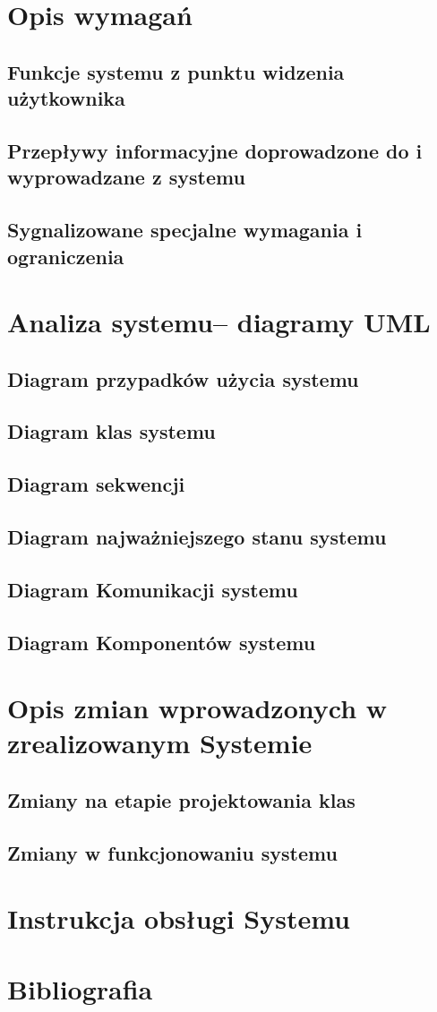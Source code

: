\documentclass[11pt,a4paper]{article}
\begin{document}
\section {Opis wymagań}
\subsection {Funkcje systemu z punktu widzenia użytkownika}
\subsection {Przepływy informacyjne doprowadzone do i wyprowadzane z systemu}
\subsection {Sygnalizowane specjalne wymagania i ograniczenia}

\section {Analiza systemu– diagramy UML}
\subsection {Diagram przypadków użycia systemu}
\subsection {Diagram klas systemu}
\subsection {Diagram sekwencji}
\subsection {Diagram najważniejszego stanu systemu}
\subsection {Diagram Komunikacji systemu}
\subsection {Diagram Komponentów systemu}

\section {Opis zmian wprowadzonych w zrealizowanym Systemie }
\subsection {Zmiany na etapie projektowania klas}
\subsection {Zmiany w funkcjonowaniu systemu}

\section {Instrukcja obsługi Systemu}

\section{Bibliografia}



\end{document}
